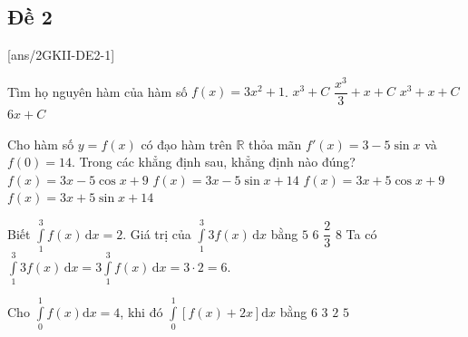\subsection{Đề 2}
	[ans/2GKII-DE2-1]
\caulc

\begin{ex}%
	Tìm họ nguyên hàm của hàm số $f(x)=3 x^2+1$.
	\choice
	{$x^3+C$}
	{$\dfrac{x^3}{3}+x+C$}
	{\True $x^3+x+C$}
	{$6 x+C$}
\end{ex}

\begin{ex}%
	Cho hàm số $y=f(x)$ có đạo hàm trên $\mathbb{R}$ thỏa mãn $f'(x)=3-5\sin x$ và $f(0)=14$. Trong các khẳng định sau, khẳng định nào đúng?
	\choice
	{$f(x)=3x-5\cos x+9$}
	{$f(x)=3x-5\sin x+14$}
	{\True $f(x)=3x+5\cos x+9$}
	{$f(x)=3x+5\sin x+14$}
\end{ex}

\begin{ex}%
	Biết $\displaystyle \int\limits_1^3 f(x)\mathrm{\,d}x=2$. Giá trị của $\displaystyle \int\limits_1^3 3f(x)\mathrm{\,d}x$ bằng
	\choice
	{$5$}
	{\True $6$}
	{$\dfrac{2}{3}$}
	{$8$}
	\loigiai
	{
		Ta có $\displaystyle \int\limits_1^3 3f(x)\mathrm{\,d}x=3 \int\limits_1^3 f(x)\mathrm{\,d}x=3\cdot 2=6$.
	}
\end{ex}


\begin{ex}%
	Cho $\displaystyle \int \limits_{0}^{1}f(x)\mathrm{d}x=4$, khi đó $\displaystyle \int \limits_{0}^{1}[f(x)+2x]\mathrm{d}x$ bằng
	\choice
	{$6$}
	{$3$}
	{$2$}
	{\True $5$}
\end{ex}

